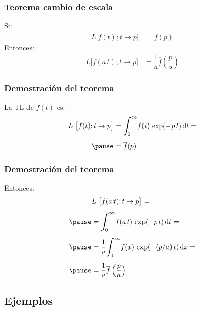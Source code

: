 \begin{frame}
\frametitle{Teorema cambio de escala}
Si:
\pause
\begin{align*}
L \big[  f (t); t \to p  \big] &= \overline{f} (p)
\end{align*}
\pause
Entonces:
\pause
\begin{align*}
L \big[  f (a \, t); t \to p  \big] &= \dfrac{1}{a}\overline{f} \left(\dfrac{p}{a}\right)
\end{align*}
\end{frame}
\begin{frame}
\frametitle{Demostración del teorema}
La TL de $f (t)$ es:
\pause
\begin{eqnarray*}
\begin{aligned}
L \big[  f (t); t \to p  \big] &= \scaleint{6ex}_{\bs 0}^{\infty} f (t) \, \exp(-p \, t) \dd{t} = \\[0.5em] \pause
&= \overline{f} (p)
\end{aligned}
\end{eqnarray*}
\end{frame}
\begin{frame}
\frametitle{Demostración del teorema}
Entonces:
\pause
\begin{eqnarray}
\begin{aligned}[b]
&L \big[  f(a \, t); t \to p  \big] = \\[0.5em] \pause
&= \scaleint{6ex}_{\bs 0}^{\infty} f (a \, t) \, \exp(-p \, t) \dd{t} = \\[0.5em] \pause 
&= \dfrac{1}{a} \scaleint{6ex}_{\bs 0}^{\infty} f (x) \, \exp(- (p/a) \, t) \dd{x} = \\[0.5em] \pause
&= \dfrac{1}{a}\overline{f} \left(\dfrac{p}{a}\right)
\end{aligned}
\label{eq:ecuacion_03_09}
\end{eqnarray}
\end{frame}

\subsection{Ejemplos}

